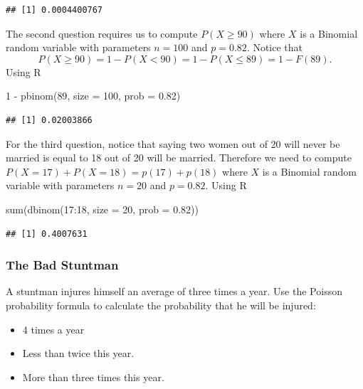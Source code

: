 \documentclass[
]{book}
\newenvironment{Shaded}{\begin{snugshade}}{\end{snugshade}}
\newcommand{\AttributeTok}[1]{\textcolor[rgb]{0.77,0.63,0.00}{#1}}
\newcommand{\DecValTok}[1]{\textcolor[rgb]{0.00,0.00,0.81}{#1}}
\newcommand{\FloatTok}[1]{\textcolor[rgb]{0.00,0.00,0.81}{#1}}
\newcommand{\FunctionTok}[1]{\textcolor[rgb]{0.00,0.00,0.00}{#1}}
\newcommand{\NormalTok}[1]{#1}
\newcommand{\SpecialCharTok}[1]{\textcolor[rgb]{0.00,0.00,0.00}{#1}}
\theoremstyle{definition}
\theoremstyle{definition}
\theoremstyle{definition}
\theoremstyle{definition}
\theoremstyle{remark}
\begin{document}
\begin{verbatim}
## [1] 0.0004400767
\end{verbatim}

The second question requires us to compute \(P(X\geq 90)\) where \(X\) is a Binomial random variable with parameters \(n=100\) and \(p = 0.82\). Notice that
\[
P(X\geq 90) = 1 - P(X< 90) = 1 - P(X\leq 89) = 1 - F(89).
\]
Using R

\begin{Shaded}
\begin{Highlighting}[]
\DecValTok{1} \SpecialCharTok{{-}} \FunctionTok{pbinom}\NormalTok{(}\DecValTok{89}\NormalTok{, }\AttributeTok{size =} \DecValTok{100}\NormalTok{,  }\AttributeTok{prob =} \FloatTok{0.82}\NormalTok{)}
\end{Highlighting}
\end{Shaded}

\begin{verbatim}
## [1] 0.02003866
\end{verbatim}

For the third question, notice that saying two women out of 20 will never be married is equal to 18 out of 20 will be married. Therefore we need to compute \(P(X=17) + P(X=18)= p(17) + p(18)\) where \(X\) is a Binomial random variable with parameters \(n=20\) and \(p = 0.82\). Using R

\begin{Shaded}
\begin{Highlighting}[]
\FunctionTok{sum}\NormalTok{(}\FunctionTok{dbinom}\NormalTok{(}\DecValTok{17}\SpecialCharTok{:}\DecValTok{18}\NormalTok{, }\AttributeTok{size =} \DecValTok{20}\NormalTok{, }\AttributeTok{prob =} \FloatTok{0.82}\NormalTok{))}
\end{Highlighting}
\end{Shaded}

\begin{verbatim}
## [1] 0.4007631
\end{verbatim}

\hypertarget{the-bad-stuntman}{%
\subsubsection{The Bad Stuntman}\label{the-bad-stuntman}}

A stuntman injures himself an average of three times a year. Use the Poisson probability formula to calculate the probability that he will be injured:

\begin{itemize}
\item
  4 times a year
\item
  Less than twice this year.
\item
  More than three times this year.
\end{itemize}
\end{document}
